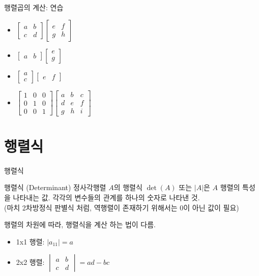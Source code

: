 \documentclass[aspectratio=169]{beamer}
\begin{document}
\begin{frame}{행렬곱의 계산: 연습}
\begin{itemize}
    \item \(  \begin{bmatrix} a & b \\ c & d \end{bmatrix}
              \begin{bmatrix} e & f \\ g & h \end{bmatrix} \)
    \item \(  \begin{bmatrix} a & b \end{bmatrix}
              \begin{bmatrix} e \\ g \end{bmatrix} \)
    \item \(  \begin{bmatrix} a  \\ c  \end{bmatrix}
              \begin{bmatrix} e & f \end{bmatrix} \)
    \item \(  \begin{bmatrix} 1 & 0 & 0 \\ 0 & 1 & 0 \\ 0 & 0 & 1 \end{bmatrix}
              \begin{bmatrix} a & b & c \\ d & e & f \\ g & h & i \end{bmatrix} \)
\end{itemize}
\end{frame}


\section{행렬식}
\begin{frame}{행렬식}
  \begin{block}{행렬식 (Determinant)}
    정사각행렬 \( A \)의 행렬식 \( \det(A) \) 또는 \( |A| \)은 $A$ 행렬의 특성을 나타내는 값. 각각의 변수들의 관계를 하나의 숫자로 나타낸 것. \\
    (마치 2차방정식 판별식 처럼, 역행렬이 존재하기 위해서는 0이 아닌 값이 필요)
  \end{block}
  \vspace{10pt}
  행렬의 차원에 따라, 행렬식을 계산 하는 법이 다름.
  \begin{itemize}
    \item 1x1 행렬: \( |a_{11}| = a \)
    \item 2x2 행렬: \( \begin{vmatrix} a & b \\ c & d \end{vmatrix} = ad-bc \)
  \end{itemize}
\end{frame}
\end{document}
